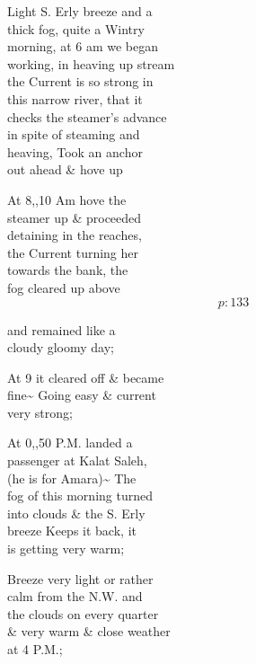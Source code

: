 \documentclass{report}
\begin{document}
	\par{
 	Light S. Erly breeze and a\ \\thick fog, quite a Wintry\ \\morning, at 6 am we began\ \\working, in heaving up stream\ \\the Current is so strong in\ \\this narrow river, that it\ \\checks the steamer's advance\ \\in spite of steaming and\ \\heaving, Took an anchor\ \\out ahead \& hove up\ \\
	}

	\par{
 	At 8,,10 Am hove the\ \\steamer up \& proceeded\ \\detaining in the reaches,\ \\the Current turning her\ \\towards the bank, the\ \\fog cleared up above\ \\
  \[p: 133 \]

	}


	\par{
 	and remained like a\ \\cloudy gloomy day;\ \\
	}

	\par{
 	At 9 it cleared off \& became\ \\fine\~{} Going easy \& current\ \\very strong;\ \\
	}

	\par{
 	At 0,,50 P.M. landed a\ \\passenger at Kalat Saleh,\ \\(he is for Amara)\~{} The\ \\fog of this morning turned\ \\into clouds \& the S. Erly\ \\breeze Keeps it back, it\ \\is getting very warm;\ \\
	}

	\par{
 	Breeze very light or rather\ \\calm from the N.W. and\ \\the clouds on every quarter\ \\\& very warm \& close weather\ \\at 4 P.M.;\ \\
	}
\end{document}
